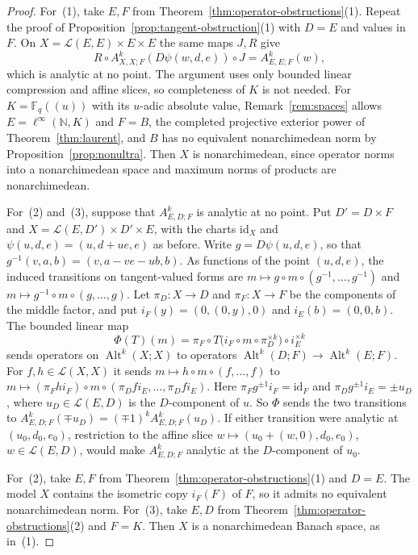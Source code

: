 \documentclass[11pt]{amsart}
\theoremstyle{definition}
\theoremstyle{remark}
\numberwithin{equation}{section}
\newcommand{\N}{\mathbb N}
\newcommand{\F}{\mathbb F}
\newcommand{\cL}{\mathcal L}
\newcommand{\Alt}{\operatorname{Alt}}
\newcommand{\linf}{\ell^\infty}
\newcommand{\id}{\mathrm{id}}
\begin{document}
\begin{proof}
For~(1), take $E,F$ from Theorem~\ref{thm:operator-obstructions}(1). Repeat the proof of Proposition~\ref{prop:tangent-obstruction}(1) with $D=E$ and values in $F$. On $X=\cL(E,E)\times E\times E$ the same maps $J,R$ give
\[
 R\circ A^k_{X,X;F}(D\psi(w,d,e))\circ J=A^k_{E,E;F}(w),
\]
which is analytic at no point. The argument uses only bounded linear compression and affine slices, so completeness of $K$ is not needed. For $K=\F_q((u))$ with its $u$\nobreakdash-adic absolute value, Remark~\ref{rem:spaces} allows $E=\linf(\N,K)$ and $F=B$, the completed projective exterior power of Theorem~\ref{thm:laurent}, and $B$ has no equivalent nonarchimedean norm by Proposition~\ref{prop:nonultra}. Then $X$ is nonarchimedean, since operator norms into a nonarchimedean space and maximum norms of products are nonarchimedean.

For~(2) and~(3), suppose that $A^k_{E,D;F}$ is analytic at no point. Put $D'=D\times F$ and $X=\cL(E,D')\times D'\times E$, with the charts $\id_X$ and $\psi(u,d,e)=(u,d+ue,e)$ as before. Write $g=D\psi(u,d,e)$, so that $g^{-1}(v,a,b)=(v,a-ve-ub,b)$. As functions of the point $(u,d,e)$, the induced transitions on tangent-valued forms are $m\mapsto g\circ m\circ(g^{-1},\ldots,g^{-1})$ and $m\mapsto g^{-1}\circ m\circ(g,\ldots,g)$. Let $\pi_D\colon X\to D$ and $\pi_F\colon X\to F$ be the components of the middle factor, and put $i_F(y)=(0,(0,y),0)$ and $i_E(b)=(0,0,b)$. The bounded linear map
\[
 \Phi(T)(m)=\pi_F\circ T\bigl(i_F\circ m\circ\pi_D^{\times k}\bigr)\circ i_E^{\times k}
\]
sends operators on $\Alt^k(X;X)$ to operators $\Alt^k(D;F)\to\Alt^k(E;F)$. For $f,h\in\cL(X,X)$ it sends $m\mapsto h\circ m\circ(f,\ldots,f)$ to $m\mapsto(\pi_Fhi_F)\circ m\circ(\pi_Dfi_E,\ldots,\pi_Dfi_E)$. Here $\pi_Fg^{\pm1}i_F=\id_F$ and $\pi_Dg^{\pm1}i_E=\pm u_D$, where $u_D\in\cL(E,D)$ is the $D$\nobreakdash-component of $u$. So $\Phi$ sends the two transitions to $A^k_{E,D;F}(\mp u_D)=(\mp1)^kA^k_{E,D;F}(u_D)$. If either transition were analytic at $(u_0,d_0,e_0)$, restriction to the affine slice $w\mapsto(u_0+(w,0),d_0,e_0)$, $w\in\cL(E,D)$, would make $A^k_{E,D;F}$ analytic at the $D$\nobreakdash-component of $u_0$.

For~(2), take $E,F$ from Theorem~\ref{thm:operator-obstructions}(1) and $D=E$. The model $X$ contains the isometric copy $i_F(F)$ of $F$, so it admits no equivalent nonarchimedean norm. For~(3), take $E,D$ from Theorem~\ref{thm:operator-obstructions}(2) and $F=K$. Then $X$ is a nonarchimedean Banach space, as in~(1).
\end{proof}
\end{document}
